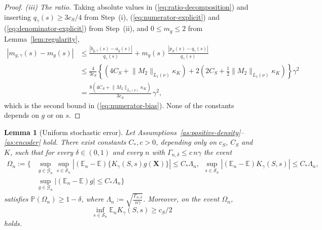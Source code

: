 \documentclass{article} %
\newtheorem{lemma}[theorem]{Lemma}
\begin{document}
\begin{proof}
\emph{(iii) The ratio.}  Taking absolute values in (\ref{eq:ratio-decomposition}) and inserting $q_{\gamma}(s)\ge3c_S/4$ from Step~(i), (\ref{eq:numerator-explicit}) and (\ref{eq:denominator-explicit}) from Step~(ii), and $0\le m_g\le2$ from Lemma~\ref{lem:regularity},
\[
\begin{aligned}
  \left|m_{g,\gamma}(s)-m_g(s)\right|
  &\le\frac{\left|b_{g,\gamma}(s)-a_g(s)\right|}{q_{\gamma}(s)}
   +m_g(s)\,\frac{\left|p_S(s)-q_{\gamma}(s)\right|}{q_{\gamma}(s)}
  \\
  &\le\frac{4}{3c_S}\left\{\left(4C_S+\lVert M_2\rVert_{L_1(\nu)}\kappa_K\right)
   +2\left(2C_S+\tfrac12\lVert M_2\rVert_{L_1(\nu)}\kappa_K\right)\right\}\gamma^2
  \\
  &=\frac{8\left(4C_S+\lVert M_2\rVert_{L_1(\nu)}\kappa_K\right)}{3c_S}\,\gamma^2 ,
\end{aligned}
\]
which is the second bound in (\ref{eq:numerator-bias}).  None of the constants depends on $g$ or on $s$.
\end{proof}

\begin{lemma}[Uniform stochastic error]
\label{lem:stochastic}
Let Assumptions~\ref{as:positive-density}--\ref{as:encoder} hold.  There exist constants $C_\ast,c>0$, depending only on $c_S$, $C_S$ and $K$, such that for every $\delta\in(0,1)$ and every $n$ with $\Gamma_{n,\delta}\le c\,n\gamma$ the event
\begin{equation}
\begin{aligned}
  \Omega_n:=\Bigg\{
  &\sup_{g\in\mathcal{G}_n}\sup_{s\in\mathcal{S}_n}
   \left|(\mathbb{E}_n-\mathbb{E})\{K_{\gamma}(S,s)g(\mathbf{X})\}\right|
   \le C_\ast\Lambda_n,\ \
   \sup_{s\in\mathcal{S}_n}
   \left|(\mathbb{E}_n-\mathbb{E})K_{\gamma}(S,s)\right|\le C_\ast\Lambda_n,
  \\
  &\sup_{g\in\mathcal{G}_n}\left|(\mathbb{E}_n-\mathbb{E})g\right|\le C_\ast\Lambda_n
  \Bigg\}
\end{aligned}
  \label{eq:good-event}
\end{equation}
satisfies $\mathbb{P}(\Omega_n)\ge1-\delta$, where $\Lambda_n:=\sqrt{\frac{\Gamma_{n,\delta}}{n\gamma}}$.  Moreover, on the event $\Omega_n$,
\begin{equation}
\inf_{s\in\mathcal{S}_n}\mathbb{E}_nK_{\gamma}(S,s)\ge c_S/2
\label{eq:denominator-lower}
\end{equation}
holds.

\end{lemma}
\end{document}
